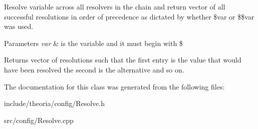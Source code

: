 Resolve variable across all resolvers in the chain and return vector of all successful resolutions in order of precedence as dictated by whether \$\textquotesingle{}var or \$\$\textquotesingle{}var\textquotesingle{} was used.


\begin{DoxyParams}{Parameters}
{\em var} & is the variable and it must begin with \textquotesingle{}\$\textquotesingle{}\\
\hline
\end{DoxyParams}
\begin{DoxyReturn}{Returns}
vector of resolutions such that the first entry is the value that would have been resolved the second is the alternative and so on. 
\end{DoxyReturn}


The documentation for this class was generated from the following files\+:\begin{DoxyCompactItemize}
\item 
include/theoria/config/Resolve.\+h\item 
src/config/Resolve.\+cpp\end{DoxyCompactItemize}

